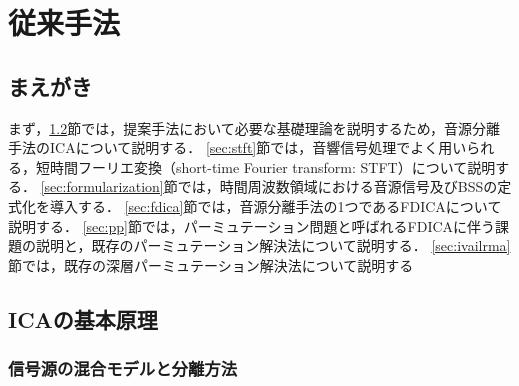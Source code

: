 \chapter{従来手法}
\label{chap:conv}

\section{まえがき}
まず，\ref{sec:ica}節では，提案手法において必要な基礎理論を説明するため，音源分離手法のICAについて説明する．
\ref{sec:stft}節では，音響信号処理でよく用いられる，短時間フーリエ変換（short-time Fourier transform: STFT）について説明する．
\ref{sec:formularization}節では，時間周波数領域における音源信号及びBSSの定式化を導入する．
\ref{sec:fdica}節では，音源分離手法の1つであるFDICAについて説明する．
\ref{sec:pp}節では，パーミュテーション問題と呼ばれるFDICAに伴う課題の説明と，既存のパーミュテーション解決法について説明する．
\ref{sec:ivailrma}節では，既存の深層パーミュテーション解決法について説明する
\section{ICAの基本原理}
\label{sec:ica}
\subsection{信号源の混合モデルと分離方法}

